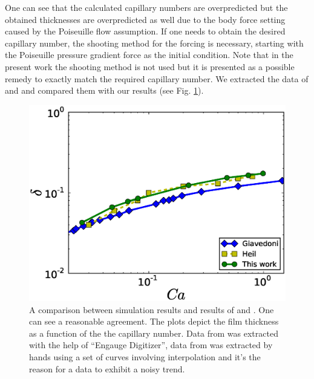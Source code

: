 \documentclass[preprint,12pt]{elsarticle}
\begin{document}
One can see that the calculated
capillary numbers are overpredicted but the obtained thicknesses are overpredicted
as well due to the body force setting caused by the Poiseuille flow assumption. If one
needs to obtain the desired capillary number, the shooting method for the forcing is
necessary, starting with the Poiseuille pressure gradient force as the initial condition. 
{\color{red} Note that in the present work the shooting method is not used but it is presented as
a possible remedy to exactly match the required capillary number.} 
We
extracted
the data of 
\citet{giavedoni-numerical} and \citet{heil-bretherton} and compared them with our results (see 
Fig. \ref{fig:capillary:comparison}).
\begin{figure}
\includegraphics[width=\textwidth]{Figures/Capillary/capillaries_comparison_real.eps}
\caption{A comparison between simulation results and results of
\citet{giavedoni-numerical} and \citet{heil-bretherton}. One can see a
reasonable agreement. The plots depict the film thickness as a function of the
the capillary number. {\color{red} Data from \cite{giavedoni-numerical} was
extracted with the help of ``Engauge Digitizer'', data from
\citet{heil-bretherton} was extracted by hands using a set of curves involving interpolation and
it's the reason for a data to exhibit a noisy trend.} \label{fig:capillary:comparison}}
\end{figure}
\end{document}
